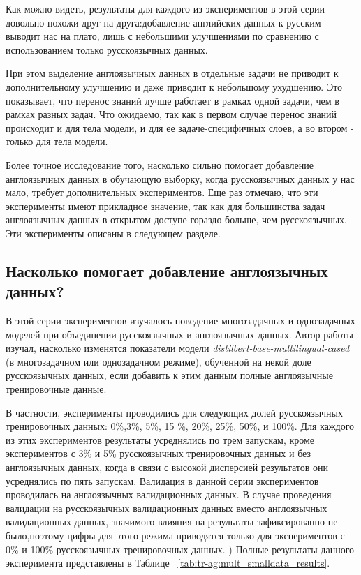 Как можно видеть, результаты для каждого из экспериментов в этой серии довольно похожи друг на друга:добавление английских данных к русским выводит нас на плато, лишь с небольшими улучшениями по сравнению с использованием только русскоязычных данных.  

При этом выделение англоязычных данных в отдельные задачи не приводит к дополнительному улучшению и даже приводит к небольшому ухудшению. Это показывает, что перенос знаний лучше работает в рамках одной задачи, чем в рамках разных задач. Что ожидаемо, так как в первом случае перенос знаний происходит и для тела модели, и для ее задаче-специфичных слоев, а во втором - только для тела модели. 

Более точное исследование того, насколько сильно помогает добавление англоязычных данных в обучающую выборку, когда русскоязычных данных у нас мало, требует дополнительных экспериментов. Еще раз отмечаю, что эти эксперименты имеют прикладное значение, так как для большинства задач англоязычных данных в открытом доступе гораздо больше, чем русскоязычных. Эти эксперименты описаны в следующем разделе.

\subsection{Насколько помогает добавление англоязычных данных? }

В этой серии экспериментов изучалось поведение многозадачных и однозадачных моделей при объединении русскоязычных и англоязычных данных.  Автор работы изучал, насколько изменятся показатели модели \textit{distilbert-base-multilingual-cased} (в многозадачном или однозадачном режиме), обученной на некой доле русскоязычных данных, если добавить к этим данным полные англоязычные тренировочные данные.

В частности, эксперименты проводились для следующих долей русскоязычных тренировочных данных: 0\%,3\%, 5\%, 15 \%, 20\%, 25\%, 50\%, и 100\%. Для каждого из этих экспериментов результаты усреднялись по трем запускам, кроме экспериментов с 3\% и 5\% русскоязычных тренировочных данных и без англоязычных данных, когда в связи с высокой дисперсией результатов они усреднялись по пять запускам. 
Валидация в данной серии экспериментов проводилась на англоязычных валидационных данных. В случае проведения валидации на русскоязычных валидационных данных вместо англоязычных валидационных данных, значимого влияния на результаты зафиксированно не было,поэтому цифры для этого режима приводятся только для экспериментов с 0\% и 100\% русскоязычных тренировочных данных. ) 
 Полные результаты данного эксперимента представлены в Таблице ~\ref{tab:tr-ag:mult_smalldata_results}. 

